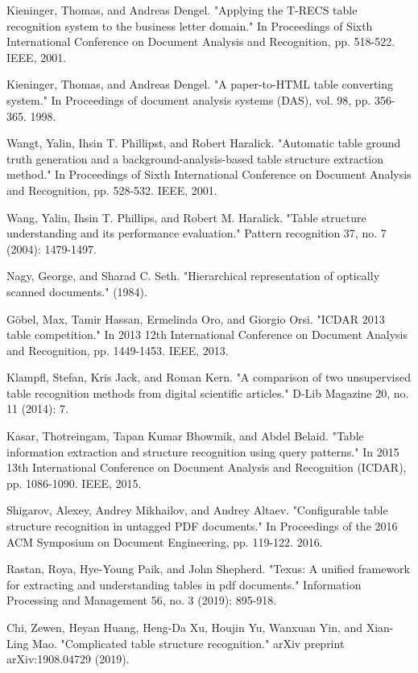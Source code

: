 \documentclass{ieeeaccess}
\begin{document}
\begin{thebibliography}{00}
 Kieninger, Thomas, and Andreas Dengel. "Applying the T-RECS table recognition system to the business letter domain." In Proceedings of Sixth International Conference on Document Analysis and Recognition, pp. 518-522. IEEE, 2001.

 Kieninger, Thomas, and Andreas Dengel. "A paper-to-HTML table converting system." In Proceedings of document analysis systems (DAS), vol. 98, pp. 356-365. 1998.


 Wangt, Yalin, Ihsin T. Phillipst, and Robert Haralick. "Automatic table ground truth generation and a background-analysis-based table structure extraction method." In Proceedings of Sixth International Conference on Document Analysis and Recognition, pp. 528-532. IEEE, 2001.

 Wang, Yalin, Ihsin T. Phillips, and Robert M. Haralick. "Table structure understanding and its performance evaluation." Pattern recognition 37, no. 7 (2004): 1479-1497.


 Nagy, George, and Sharad C. Seth. "Hierarchical representation of optically scanned documents." (1984).


 Göbel, Max, Tamir Hassan, Ermelinda Oro, and Giorgio Orsi. "ICDAR 2013 table competition." In 2013 12th International Conference on Document Analysis and Recognition, pp. 1449-1453. IEEE, 2013.

 Klampfl, Stefan, Kris Jack, and Roman Kern. "A comparison of two unsupervised table recognition methods from digital scientific articles." D-Lib Magazine 20, no. 11 (2014): 7.

  Kasar, Thotreingam, Tapan Kumar Bhowmik, and Abdel Belaid. "Table information extraction and structure recognition using query patterns." In 2015 13th International Conference on Document Analysis and Recognition (ICDAR), pp. 1086-1090. IEEE, 2015.

 Shigarov, Alexey, Andrey Mikhailov, and Andrey Altaev. "Configurable table structure recognition in untagged PDF documents." In Proceedings of the 2016 ACM Symposium on Document Engineering, pp. 119-122. 2016.

 Rastan, Roya, Hye-Young Paik, and John Shepherd. "Texus: A unified framework for extracting and understanding tables in pdf documents." Information Processing and Management 56, no. 3 (2019): 895-918.

 Chi, Zewen, Heyan Huang, Heng-Da Xu, Houjin Yu, Wanxuan Yin, and Xian-Ling Mao. "Complicated table structure recognition." arXiv preprint arXiv:1908.04729 (2019).


\end{thebibliography}
\end{document}
